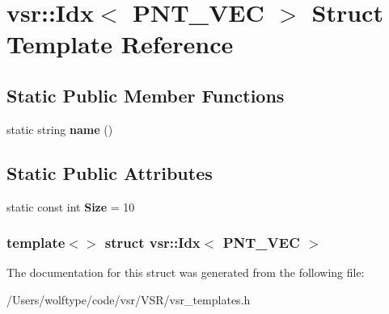 \hypertarget{structvsr_1_1_idx_3_01_p_n_t___v_e_c_01_4}{\section{vsr\-:\-:Idx$<$ P\-N\-T\-\_\-\-V\-E\-C $>$ Struct Template Reference}
\label{structvsr_1_1_idx_3_01_p_n_t___v_e_c_01_4}
}
\subsection*{Static Public Member Functions}
\begin{DoxyCompactItemize}
\item 
\hypertarget{structvsr_1_1_idx_3_01_p_n_t___v_e_c_01_4_a760f9ac3a7df804b55886046f707774f}{static string {\bfseries name} ()}\label{structvsr_1_1_idx_3_01_p_n_t___v_e_c_01_4_a760f9ac3a7df804b55886046f707774f}

\end{DoxyCompactItemize}
\subsection*{Static Public Attributes}
\begin{DoxyCompactItemize}
\item 
\hypertarget{structvsr_1_1_idx_3_01_p_n_t___v_e_c_01_4_ac7408310e225792652d5d8e161eb06cc}{static const int {\bfseries Size} = 10}\label{structvsr_1_1_idx_3_01_p_n_t___v_e_c_01_4_ac7408310e225792652d5d8e161eb06cc}

\end{DoxyCompactItemize}
\subsubsection*{template$<$$>$ struct vsr\-::\-Idx$<$ P\-N\-T\-\_\-\-V\-E\-C $>$}



The documentation for this struct was generated from the following file\-:\begin{DoxyCompactItemize}
\item 
/\-Users/wolftype/code/vsr/\-V\-S\-R/vsr\-\_\-templates.\-h\end{DoxyCompactItemize}
